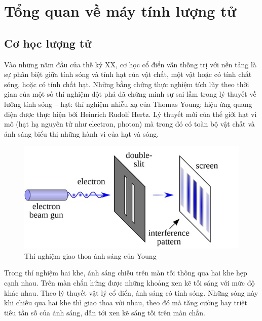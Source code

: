 \chapter{Tổng quan về máy tính lượng tử}
\section{Cơ học lượng tử}
Vào những năm đầu của thế kỷ XX, cơ học cổ điển vẫn thống trị với nền tảng là sự phân biệt giữa tính sóng và tính hạt của vật chất, một vật hoặc có tính chất sóng, hoặc có tính chất hạt. Những bằng chứng thực nghiệm tích lũy theo thời gian của một số thí nghiệm đột phá đã chứng minh sự sai lầm trong lý thuyết về lưỡng tính sóng – hạt: thí nghiệm nhiễu xạ của Thomas Young; hiệu ứng quang điện được thực hiện bởi Heinrich Rudolf Hertz. Lý thuyết mới của thế giới hạt vi mô (hạt hạ nguyên tử như electron, photon) mà trong đó có toàn bộ vật chất và ánh sáng biểu thị những hành vi của hạt và sóng.\\
\begin{figure}
    \centering
    \includegraphics[scale=0.6]{graphics/chapter-1/chapter1-young-experienced.jpg}
    \caption{Thí nghiệm giao thoa ánh sáng của Young}
    \label{fig:my_label}
\end{figure}
\indent Trong thí nghiệm hai khe, ánh sáng chiếu trên màn tối thông qua hai khe hẹp cạnh nhau. Trên màn chắn hứng được những khoảng xen kẽ tối sáng với mức độ khác nhau. Theo lý thuyết vật lý cổ điển, ánh sáng có tính sóng. Những sóng này khi chiếu qua hai khe thì giao thoa với nhau, theo đó mà tăng cường hay triệt tiêu tần số của ánh sáng, dẫn tới xen kẽ sáng tối trên màn chắn.

